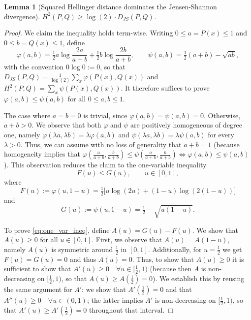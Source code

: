 \documentclass{article}
\newtheorem{lemma}{Lemma}
\begin{document}
\begin{lemma}[Squared Hellinger distance dominates the Jensen-Shannon divergence]
\label{lem:hellinger_djs}
$H^{2}(P,Q) \geq \log(2)\cdot D_{JS}(P,Q)$.
\end{lemma}
\begin{proof}
We claim the inequality holds term-wise. Writing $0 \leq a = P(x)\leq 1$ and $0 \leq b = Q(x)\leq 1$, define
\begin{equation}
    \varphi(a,b) = \tfrac{1}{2}a\log\frac{2a}{a+b} + \tfrac{1}{2}b\log\frac{2b}{a+b}, \qquad
    \psi(a,b) = \tfrac{1}{2}(a+b) - \sqrt{ab},
\label{eq:phi_psi_def}
\end{equation}
with the convention $0\log 0 := 0$, so that $D_{JS}(P,Q) = \frac{1}{\log(2)}\sum_x \varphi(P(x),Q(x))$ and $H^{2}(P,Q) = \sum_x \psi(P(x),Q(x))$. It therefore suffices to prove $\varphi(a,b)\leq\psi(a,b)$ for all $0 \leq a,b\leq 1$.
 
The case where $a=b=0$ is trivial, since $\varphi(a,b) = \psi(a,b) = 0$. Otherwise, $a+b > 0$. We observe that both $\varphi$ and $\psi$ are positively homogeneous of degree one, namely $\varphi(\lambda a,\lambda b)=\lambda\varphi(a,b)$ and $\psi(\lambda a,\lambda b)=\lambda\psi(a,b)$ for every $\lambda>0$. Thus, we can assume with no loss of generality that $a+b=1$ (because homogeneity implies that $\varphi(\frac{a}{a+b},\frac{b}{a+b})\leq\psi(\frac{a}{a+b},\frac{b}{a+b}) \iff \varphi(a,b)\leq\psi(a,b)$). This observation reduces the claim to the one-variable inequality
\begin{equation}
    F(u) \leq G(u), \qquad u\in[0,1],
\label{eq:one_var_ineq}
\end{equation}
where
\begin{equation}
    F(u) := \varphi(u,1-u)  = \tfrac{1}{2}\big[u\log(2u) + (1-u)\log(2(1-u))\big]
\label{eq:F_def}
\end{equation}
and
\begin{equation}
    G(u) := \psi(u, 1-u) = \tfrac{1}{2} - \sqrt{u(1-u)}.
\label{eq:G_def}
\end{equation}
 
To prove \eqref{eq:one_var_ineq}, define $A(u) = G(u) - F(u)$. We show that $A(u)\geq 0$ for all $u\in[0,1]$.
First, we observe that $A(u)=A(1-u)$, namely $A(u)$ is symmetric around $\tfrac{1}{2}$ in $[0,1]$. Additionally, for $u=\tfrac{1}{2}$ we get $F(u)=G(u)=0$ and thus $A(u)=0$. Thus, to show that $A(u)\geq 0$ it is sufficient to show that $A'(u)\geq0 \quad \forall u\in[\tfrac{1}{2},1)$ (because then $A$ is non-decreasing on $[\tfrac{1}{2},1)$, so that $A(u)\geq A(\tfrac{1}{2})=0$). We establish this by reusing the same argument for $A'$: we show that $A'(\tfrac{1}{2})=0$ and that $A''(u) \geq 0 \quad \forall u\in(0,1)$; the latter implies $A'$ is non-decreasing on $[\tfrac{1}{2},1)$, so that $A'(u)\geq A'(\tfrac{1}{2})=0$ throughout that interval.
 

\end{proof}
\end{document}
